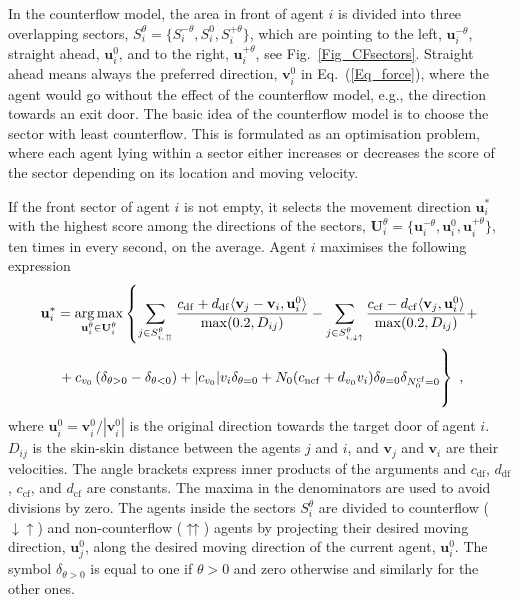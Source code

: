 \documentclass[12pt,a4paper,final,twoside]{stylevk}
\begin{document}
In the counterflow model, the area in front of agent $i$ is divided
into three overlapping sectors, $S^{\theta}_i = \lbrace S^{-\theta}_i
, S^{0}_i , S^{+\theta}_i \rbrace$, which are pointing to the left,
$\mathbf{u}^{-\theta}_i$, straight ahead, $\mathbf{u}^{0}_i$, and to
the right, $\mathbf{u}^{+\theta}_i$, see
Fig.~\ref{Fig_CFsectors}.  Straight ahead means always the
preferred direction, $\mathbf{v}_i^0$ in Eq.~(\ref{Eq_force}), where
the agent would go without the effect of the counterflow model, e.g.,
the direction towards an exit door.  The basic idea of the counterflow
model is to choose the sector with least counterflow.  This is
formulated as an optimisation problem, where each agent lying within a
sector either increases or decreases the score of the sector depending
on its location and moving velocity.


If the front sector of agent $i$ is not empty, it selects the movement
direction $\mathbf{u}^*_i$ with the highest score among the directions
of the sectors, $\mathbf{U}^\theta_i = \lbrace \mathbf{u}^{-\theta}_i
, \mathbf{u}^{0}_i, \mathbf{u}^{+\theta}_i \rbrace$, ten times in every
second, on the average.  Agent $i$ maximises the following expression
%
\begin{multline}\label{Eq_CF}
  \mathbf{u}^*_i  =  \underset{\mathbf{u}^\theta_i \in
  \mathbf{U}^\theta_i} {\arg\max} \left\lbrace \sum_{j \in
  S^\theta_{i,\upuparrows}} \frac{ c_\mathrm{df}  + d_\mathrm{df}
  \langle \mathbf{v}_j - \mathbf{v}_i , \mathbf{u}^0_i \rangle
  }{\max(0.2, D_{ij})} - \sum_{j \in S^\theta_{i,\downarrow\uparrow}}
  \frac{ c_\mathrm{cf}  - d_\mathrm{cf}  \langle \mathbf{v}_j ,
  \mathbf{u}^0_i \rangle }{\max(0.2, D_{ij})} + \right. \\
  \left.  \vphantom{ \sum_{j \in
  S^\theta_{i,\upuparrows}} \frac{ c_\mathrm{df}  + d_\mathrm{df}
  \langle \mathbf{v}_j - \mathbf{v}_i , \mathbf{u}^0_i \rangle
  }{\max(0.2, D_{ij})} }
  + c_{v_0} \left( \delta_{\theta > 0}  - \delta_{\theta < 0}
  \right) + \vert c_{v_0} \vert v_i  \delta_{\theta = 0} + N_0 (
  c_\mathrm{ncf} + d_{v_0} v_i )\delta_{\theta =
  0}\delta_{N^\mathrm{cf}_0 = 0}  \right\rbrace   ~,
\end{multline}
%
where $\mathbf{u}^0_i = \mathbf{v}^0_i / |\mathbf{v}^0_i|$ is the
original direction towards the target door of agent $i$.  $D_{ij}$ is
the skin-skin distance between the agents $j$ and $i$, and
$\mathbf{v}_j$ and $\mathbf{v}_i$ are their velocities.  The angle
brackets express inner products of the arguments and $c_\mathrm{df}$,
$d_\mathrm{df}$, $c_\mathrm{cf}$, and $d_\mathrm{cf}$ are constants.
The maxima in the denominators are used to avoid divisions by zero.
The agents inside the sectors $S^\theta_i$ are divided to counterflow
($\downarrow\uparrow$) and non-counterflow ($\upuparrows$) agents by
projecting their desired moving direction, $\mathbf{u}^0_j$, along the
desired moving direction of the current agent, $\mathbf{u}^0_i$.  The
symbol $\delta_{\theta > 0}$ is equal to one if $\theta > 0$ and zero
otherwise and similarly for the other ones.
\end{document}
